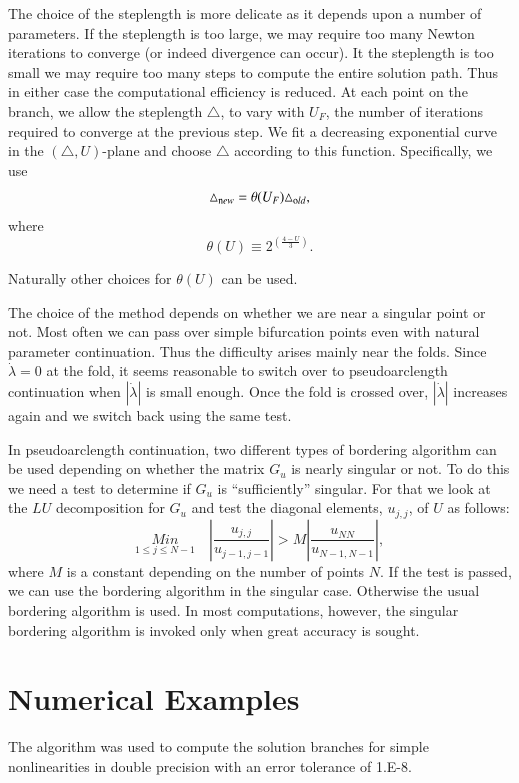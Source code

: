 The choice of the steplength is more delicate as it depends upon a
number of parameters. If the steplength is too large, we may require
too many Newton iterations to converge (or indeed divergence can
occur). It the steplength is too small we may require too many steps
to compute the entire solution path. Thus in either case the
computational efficiency is reduced. At each point on the branch, we
allow the steplength $\triangle$, to vary with $U_F$, the number of
iterations required to converge at the previous step. We fit a
decreasing exponential curve in the $(\triangle,U)$-plane and choose
$\triangle$ according to this function. Specifically, we use 
$$
\triangle_{\text new} = \theta(U_F) \triangle_{\text old}, 
$$
where
$$
\theta(U) \equiv 2^{ \left(\frac{4-U}{3} \right)}.
$$

Naturally other choices for $\theta(U)$ can be used. 
 
The choice of the method depends on whether we are near a
singular\pageoriginale 
point or not. Most often we can pass over simple bifurcation points
even with natural parameter continuation. Thus the difficulty arises
mainly near the folds. Since $\dot{\lambda} = 0$ at the fold, it seems
reasonable to switch over to pseudoarclength continuation when
$|\dot{\lambda} |$ is small enough. Once the fold is crossed over,
$|\dot{\lambda} |$ increases again and we switch back using the same
test. 

In pseudoarclength continuation, two different types of bordering
algorithm can be used depending on whether the matrix $G_u$ is nearly
singular or not. To do this we need a test to determine if $G_u$ is
``sufficiently'' singular. For that we look at the $LU$ decomposition
for $G_u$ and test the diagonal elements, $u_{j,j}$, of $U$ as follows: 
$$
\underset{1\leq j\leq N-1}{Min} \quad \left|
\frac{u_{j,j}}{u_{j-1,j-1}} \right| > M \left|
\frac{u_{NN}}{u_{N-1,N-1}} \right|, 
$$
where $M$ is a constant depending on the number of points $N$. If the
test is passed, we can use the bordering algorithm in the singular
case. Otherwise the usual bordering algorithm is used. In most
computations, however, the singular bordering algorithm is invoked
only when great accuracy is sought. 


\section{Numerical Examples}\label{chap6-sec6.17}%

The algorithm was used to compute the solution branches for simple
nonlinearities in double precision with an error tolerance of
1.E-8.

